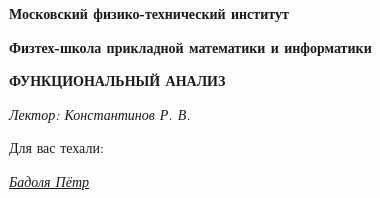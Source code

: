 \begin{titlepage}
	\centering
	{\bfseries\Large Московский физико-технический институт\par}
	{\bfseries\large Физтех-школа прикладной математики и информатики\par}
	\vspace{5cm}

	{\bfseries\LARGE ФУНКЦИОНАЛЬНЫЙ АНАЛИЗ\par}
	\vspace{1em}
	{\large\itshape Лектор: Константинов Р. В.\par}

	\vfill

	\begin{flushright}
	{\normalsize
	Для вас техали:\par
	\href{https://vk.com/akzium}{\textit{Бадоля Пётр}}\par
	}
	\end{flushright}

\end{titlepage}
